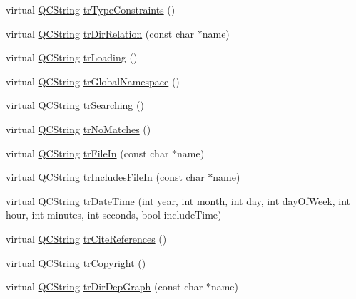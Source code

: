 \begin{DoxyCompactItemize}
virtual \mbox{\hyperlink{class_q_c_string}{Q\+C\+String}} \mbox{\hyperlink{class_translator_chinesetraditional_a5aae69c493e0af811754cbcb0e553a5d}{tr\+Type\+Constraints}} ()
\item 
virtual \mbox{\hyperlink{class_q_c_string}{Q\+C\+String}} \mbox{\hyperlink{class_translator_chinesetraditional_af3d98bcf16f0c032eae08846647e62e2}{tr\+Dir\+Relation}} (const char $\ast$name)
\item 
virtual \mbox{\hyperlink{class_q_c_string}{Q\+C\+String}} \mbox{\hyperlink{class_translator_chinesetraditional_a8bf00199efc9d136c2b3eb8e14f7db52}{tr\+Loading}} ()
\item 
virtual \mbox{\hyperlink{class_q_c_string}{Q\+C\+String}} \mbox{\hyperlink{class_translator_chinesetraditional_a1057c630dd7d991d9bffc0781b5edc7d}{tr\+Global\+Namespace}} ()
\item 
virtual \mbox{\hyperlink{class_q_c_string}{Q\+C\+String}} \mbox{\hyperlink{class_translator_chinesetraditional_a0b5925558367798e34bbf91af1a54ad8}{tr\+Searching}} ()
\item 
virtual \mbox{\hyperlink{class_q_c_string}{Q\+C\+String}} \mbox{\hyperlink{class_translator_chinesetraditional_a6df759ab56adf5043d7cb8bb4fd0d3eb}{tr\+No\+Matches}} ()
\item 
virtual \mbox{\hyperlink{class_q_c_string}{Q\+C\+String}} \mbox{\hyperlink{class_translator_chinesetraditional_a77a64b93b8ae15e492ce3481ebb54490}{tr\+File\+In}} (const char $\ast$name)
\item 
virtual \mbox{\hyperlink{class_q_c_string}{Q\+C\+String}} \mbox{\hyperlink{class_translator_chinesetraditional_ad41ba324119546456ffe0ef517513aa2}{tr\+Includes\+File\+In}} (const char $\ast$name)
\item 
virtual \mbox{\hyperlink{class_q_c_string}{Q\+C\+String}} \mbox{\hyperlink{class_translator_chinesetraditional_a8c32275e7278645b252fdf1a54dd4875}{tr\+Date\+Time}} (int year, int month, int day, int day\+Of\+Week, int hour, int minutes, int seconds, bool include\+Time)
\item 
virtual \mbox{\hyperlink{class_q_c_string}{Q\+C\+String}} \mbox{\hyperlink{class_translator_chinesetraditional_a3b2598c73b1ee59b57f88082508b86c1}{tr\+Cite\+References}} ()
\item 
virtual \mbox{\hyperlink{class_q_c_string}{Q\+C\+String}} \mbox{\hyperlink{class_translator_chinesetraditional_a29d2d31637c35174fd2aea7997837d9f}{tr\+Copyright}} ()
\item 
virtual \mbox{\hyperlink{class_q_c_string}{Q\+C\+String}} \mbox{\hyperlink{class_translator_chinesetraditional_a6a71434eafd28ebaea266715005fcf8e}{tr\+Dir\+Dep\+Graph}} (const char $\ast$name)

\end{DoxyCompactItemize}
